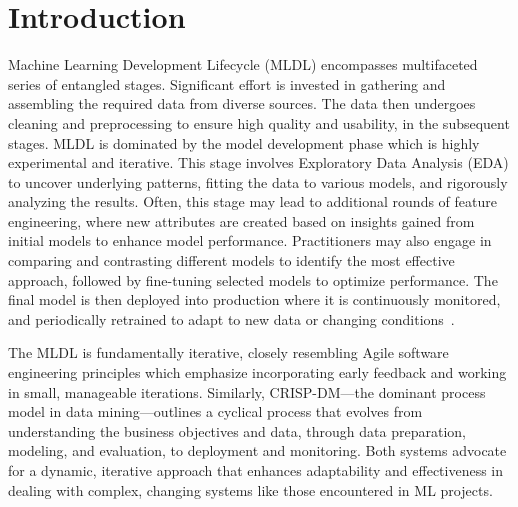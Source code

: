 \section{Introduction}

Machine Learning Development Lifecycle (MLDL) encompasses multifaceted series of entangled stages. Significant effort is invested in gathering and assembling the required data from diverse sources. The data then undergoes cleaning and preprocessing to ensure high quality and usability, in the subsequent stages. MLDL is dominated by the model development phase which is highly experimental and iterative. This stage involves Exploratory Data Analysis (EDA) to uncover underlying patterns, fitting the data to various models, and rigorously analyzing the results. Often, this stage may lead to additional rounds of feature engineering, where new attributes are created based on insights gained from initial models to enhance model performance. Practitioners may also engage in comparing and contrasting different models to identify the most effective approach, followed by fine-tuning selected models to optimize performance. The final model is then deployed into production where it is continuously monitored, and periodically retrained to adapt to new data or changing conditions~\cite{haakman2021ai,amershi2019software,sculley2015hidden}.



The MLDL is fundamentally iterative, closely resembling Agile software engineering principles which emphasize incorporating early feedback and working in small, manageable iterations. Similarly, CRISP-DM---the dominant process model in data mining---outlines a cyclical process that evolves from understanding the business objectives and data, through data preparation, modeling, and evaluation, to deployment and monitoring. Both systems advocate for a dynamic, iterative approach that enhances adaptability and effectiveness in dealing with complex, changing systems like those encountered in ML projects.

